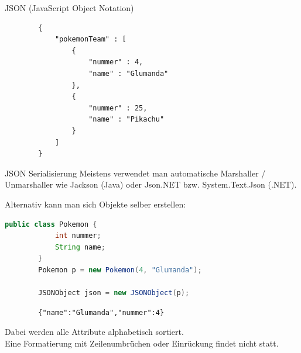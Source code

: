 \begin{example}{JSON (JavaScript Object Notation)}
    \begin{lstlisting}
        {
            "pokemonTeam" : [
                {
                    "nummer" : 4,
                    "name" : "Glumanda"
                },
                {
                    "nummer" : 25,
                    "name" : "Pikachu"
                }
            ]
        }
    \end{lstlisting}
\end{example}

\begin{bonus}{JSON Serialisierung}
    Meistens verwendet man automatische Marshaller / Unmarshaller wie Jackson (Java) oder Json.NET bzw. System.Text.Json (.NET).

    Alternativ kann man sich Objekte selber erstellen:
    \begin{lstlisting}[language=java]
        public class Pokemon {
            int nummer;
            String name;
        }
        Pokemon p = new Pokemon(4, "Glumanda");

        JSONObject json = new JSONObject(p);
    \end{lstlisting}

    \begin{lstlisting}
        {"name":"Glumanda","nummer":4}
    \end{lstlisting}

    Dabei werden alle Attribute alphabetisch sortiert.\\
    Eine Formatierung mit Zeilenumbrüchen oder Einrückung findet nicht statt.
\end{bonus}